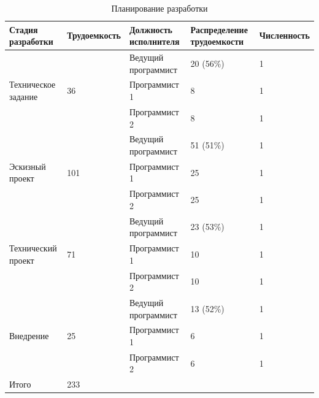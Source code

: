 \begin{table}[ht!]\footnotesize
  \caption{Планирование разработки}
  \begin{tabular}{|p{}|l|p{}|p{}|l|}
  \hline
  Стадия разработки & Трудоемкость & Должность исполнителя & Распределение трудоемкости & Численность \\
  \hline
  \multirow{3}{0.2\textwidth}{Техническое задание} & \multirow{3}{*}{36} & Ведущий программист & 20 (56\%) & 1\\
  & & Программист 1 & 8 & 1\\
  & & Программист 2 & 8 & 1\\
  \hline
  \multirow{3}{0.2\textwidth}{Эскизный проект} & \multirow{3}{*}{101} & Ведущий программист & 51 (51\%) & 1\\
  & & Программист 1 & 25 & 1\\
  & & Программист 2 & 25 & 1\\
  \hline
  \multirow{3}{0.2\textwidth}{Технический проект} & \multirow{3}{*}{71} & Ведущий программист & 23 (53\%) & 1\\
  & & Программист 1 & 10 & 1\\
  & & Программист 2 & 10 & 1\\
  \hline
  \multirow{3}{0.2\textwidth}{Внедрение} & \multirow{3}{*}{25} & Ведущий программист & 13 (52\%) & 1\\
  & & Программист 1 & 6 & 1\\
  & & Программист 2 & 6 & 1\\
  \hline
  Итого & 233 & & & \\
  \hline
  \end{tabular}
  \label{tab:planColletive}
\end{table}

\normalsize

